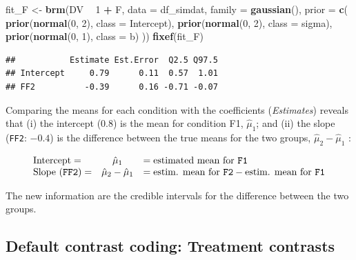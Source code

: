 \documentclass[12pt,]{krantz}
\newenvironment{Shaded}{\begin{snugshade}}{\end{snugshade}}
\newcommand{\KeywordTok}[1]{\textcolor[rgb]{0.13,0.29,0.53}{\textbf{#1}}}
\newcommand{\DataTypeTok}[1]{\textcolor[rgb]{0.13,0.29,0.53}{#1}}
\newcommand{\DecValTok}[1]{\textcolor[rgb]{0.00,0.00,0.81}{#1}}
\newcommand{\StringTok}[1]{\textcolor[rgb]{0.31,0.60,0.02}{#1}}
\newcommand{\OperatorTok}[1]{\textcolor[rgb]{0.81,0.36,0.00}{\textbf{#1}}}
\newcommand{\NormalTok}[1]{#1}
\theoremstyle{definition}
\theoremstyle{definition}
\theoremstyle{definition}
\theoremstyle{remark}
\begin{document}
\begin{Shaded}
\begin{Highlighting}[]
\NormalTok{fit_F <-}\StringTok{ }\KeywordTok{brm}\NormalTok{(DV }\OperatorTok{~}\StringTok{ }\DecValTok{1} \OperatorTok{+}\StringTok{ }\NormalTok{F,}
                 \DataTypeTok{data =}\NormalTok{ df_simdat,}
                 \DataTypeTok{family =} \KeywordTok{gaussian}\NormalTok{(),}
                 \DataTypeTok{prior =} \KeywordTok{c}\NormalTok{(}
                     \KeywordTok{prior}\NormalTok{(}\KeywordTok{normal}\NormalTok{(}\DecValTok{0}\NormalTok{, }\DecValTok{2}\NormalTok{), }\DataTypeTok{class =}\NormalTok{ Intercept),}
                     \KeywordTok{prior}\NormalTok{(}\KeywordTok{normal}\NormalTok{(}\DecValTok{0}\NormalTok{, }\DecValTok{2}\NormalTok{), }\DataTypeTok{class =}\NormalTok{ sigma),}
                     \KeywordTok{prior}\NormalTok{(}\KeywordTok{normal}\NormalTok{(}\DecValTok{0}\NormalTok{, }\DecValTok{1}\NormalTok{), }\DataTypeTok{class =}\NormalTok{ b)}
\NormalTok{                 )) }
\KeywordTok{fixef}\NormalTok{(fit_F)}
\end{Highlighting}
\end{Shaded}

\begin{verbatim}
##           Estimate Est.Error  Q2.5 Q97.5
## Intercept     0.79      0.11  0.57  1.01
## FF2          -0.39      0.16 -0.71 -0.07
\end{verbatim}

Comparing the means for each condition with the coefficients
(\emph{Estimates}) reveals that (i) the intercept (\(0.8\)) is the mean
for condition F1, \(\hat\mu_1\); and (ii) the slope (\texttt{FF2}:
\(-0.4\)) is the difference between the true means for the two groups,
\(\hat\mu_2 - \hat\mu_1\) \citep{Bolker2018}:

\begin{equation}
\begin{array}{lcl}
\text{Intercept} = & \hat{\mu}_1 & = \text{estimated mean for \texttt{F1}} \\
\text{Slope (\texttt{FF2})} = & \hat{\mu}_2 - \hat{\mu}_1 & = \text{estim. mean for \texttt{F2}} - \text{estim. mean for \texttt{F1}} 
\end{array}
\label{def:beta}
\end{equation}

The new information are the credible intervals for the difference
between the two groups.

\subsection{Default contrast coding: Treatment
contrasts}\label{treatmentcontrasts}
\end{document}
